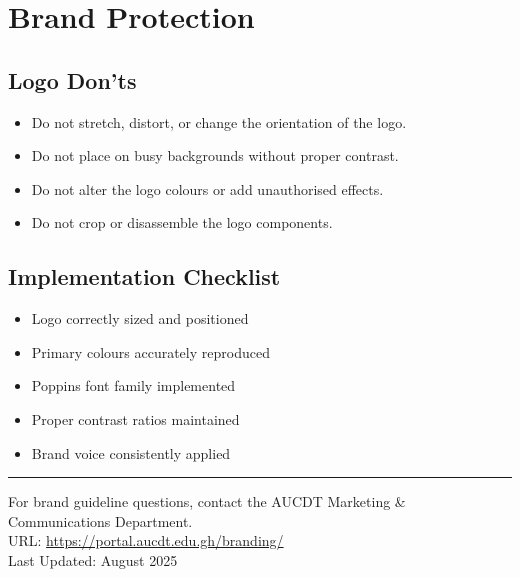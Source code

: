 \documentclass[a4paper, 11pt]{article}
\begin{document}
\section{Brand Protection}

\subsection{Logo Don'ts}
\begin{itemize}[label={\color{AUCDTBurgundy}\faTimesCircle}]
    \item Do not stretch, distort, or change the orientation of the logo.
    \item Do not place on busy backgrounds without proper contrast.
    \item Do not alter the logo colours or add unauthorised effects.
    \item Do not crop or disassemble the logo components.
\end{itemize}

\subsection{Implementation Checklist}
\begin{itemize}[label={\color{AUCDTGold}\faSquare[regular]}]
    \item Logo correctly sized and positioned
    \item Primary colours accurately reproduced
    \item Poppins font family implemented
    \item Proper contrast ratios maintained
    \item Brand voice consistently applied
\end{itemize}

\vfill
\hrule
\vspace{2mm}
\begin{center}
    \poppinslight
    For brand guideline questions, contact the AUCDT Marketing \& Communications Department. \\
    URL: \href{https://portal.aucdt.edu.gh/branding/}{https://portal.aucdt.edu.gh/branding/} \\
    Last Updated: August 2025
\end{center}
\end{document}
